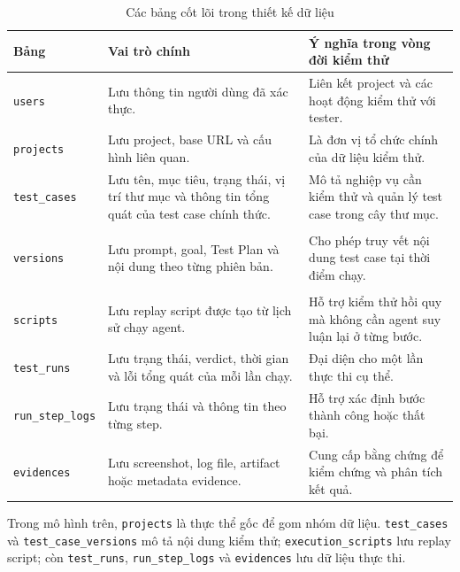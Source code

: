 \begin{table}[H]
\centering
\caption{Các bảng cốt lõi trong thiết kế dữ liệu}
\label{tab:chapter4_core_tables}
\renewcommand{\arraystretch}{1.2}
\begin{tabular}{|p{3.4cm}|p{5.0cm}|p{5.8cm}|}
\hline
\textbf{Bảng} &
\textbf{Vai trò chính} &
\textbf{Ý nghĩa trong vòng đời kiểm thử} \\
\hline

\texttt{users} &
Lưu thông tin người dùng đã xác thực. &
Liên kết project và các hoạt động kiểm thử với tester. \\
\hline

\texttt{projects} &
Lưu project, base URL và cấu hình liên quan. &
Là đơn vị tổ chức chính của dữ liệu kiểm thử. \\
\hline

\texttt{test\_cases} &
Lưu tên, mục tiêu, trạng thái, vị trí thư mục và thông tin tổng quát của test case chính thức. &
Mô tả nghiệp vụ cần kiểm thử và quản lý test case trong cây thư mục. \\
\hline

\shortstack[l]{\texttt{test\_case\_}\\\texttt{versions}} &
Lưu prompt, goal, Test Plan và nội dung theo từng phiên bản. &
Cho phép truy vết nội dung test case tại thời điểm chạy. \\
\hline

\shortstack[l]{\texttt{execution\_}\\\texttt{scripts}} &
Lưu replay script được tạo từ lịch sử chạy agent. &
Hỗ trợ kiểm thử hồi quy mà không cần agent suy luận lại ở từng bước. \\
\hline

\texttt{test\_runs} &
Lưu trạng thái, verdict, thời gian và lỗi tổng quát của mỗi lần chạy. &
Đại diện cho một lần thực thi cụ thể. \\
\hline

\texttt{run\_step\_logs} &
Lưu trạng thái và thông tin theo từng step. &
Hỗ trợ xác định bước thành công hoặc thất bại. \\
\hline

\texttt{evidences} &
Lưu screenshot, log file, artifact hoặc metadata evidence. &
Cung cấp bằng chứng để kiểm chứng và phân tích kết quả. \\
\hline
\end{tabular}
\end{table}

Trong mô hình trên, \texttt{projects} là thực thể gốc để gom nhóm dữ liệu. \texttt{test\_cases} và \texttt{test\_case\_versions} mô tả nội dung kiểm thử; \texttt{execution\_scripts} lưu replay script; còn \texttt{test\_runs}, \texttt{run\_step\_logs} và \texttt{evidences} lưu dữ liệu thực thi.

